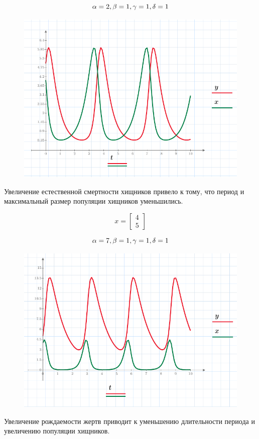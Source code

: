 \documentclass[a4paper, 14pt]{extarticle}
\begin{document}
		\noindent\[
		\alpha = 2,\\
		\beta = 1,\\
		\gamma = 1,\\
		\delta = 1
		\]
		\begin{figure}[H]
			\centering
			\includegraphics[width = \linewidth]{4.pdf}
			\caption[.] {}
		\end{figure}
		Увеличение естественной смертности хищников привело к тому, что период и максимальный размер популяции
		хищников уменьшились.
		\pagebreak
		
		\noindent \[ x = \begin{bmatrix}
			4 \\ 5
		\end{bmatrix} \]
		
		\noindent\[
		\alpha = 7,\\
		\beta = 1,\\
		\gamma = 1,\\
		\delta = 1
		\]
		\begin{figure}[H]
			\centering
			\includegraphics[width = \linewidth]{5.pdf}
			\caption[.] {}
		\end{figure}
		Увеличение рождаемости жертв приводит к уменьшению длительности периода и увеличению популяции хищников.
		\pagebreak
		
\end{document}
